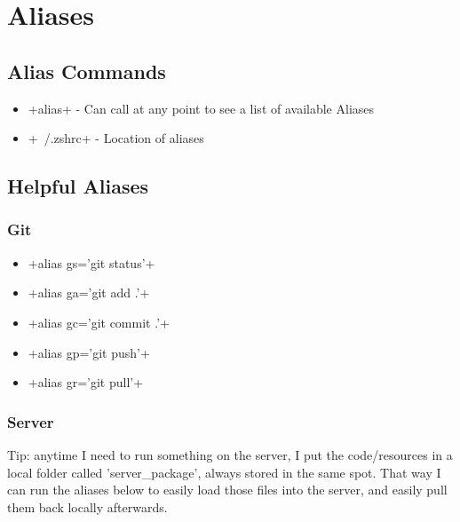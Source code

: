\documentclass{article}
\let\verb\relax
\newcommand{\verb}{\collectverb{\color{codefg}\ttfamily\colorbox{codebg}}}
\begin{document}
\tableofcontents

\newpage


\section{Aliases}

\subsection{Alias Commands}

\begin{itemize}
    \item \verb+alias+ - Can call at any point to see a list of available Aliases
    \item \verb+~/.zshrc+ - Location of aliases
\end{itemize}

\subsection{Helpful Aliases}

\subsubsection{Git}

\begin{itemize}
    \item \verb+alias gs='git status'+
    \item \verb+alias ga='git add .'+
    \item \verb+alias gc='git commit .'+
    \item \verb+alias gp='git push'+
    \item \verb+alias gr='git pull'+
\end{itemize}

\subsubsection{Server}

Tip: anytime I need to run something on the server, I put the code/resources in a local folder called 'server\_package', always stored in the same spot. That way I can run the aliases below to easily load those files into the server, and easily pull them back locally afterwards.
\end{document}
